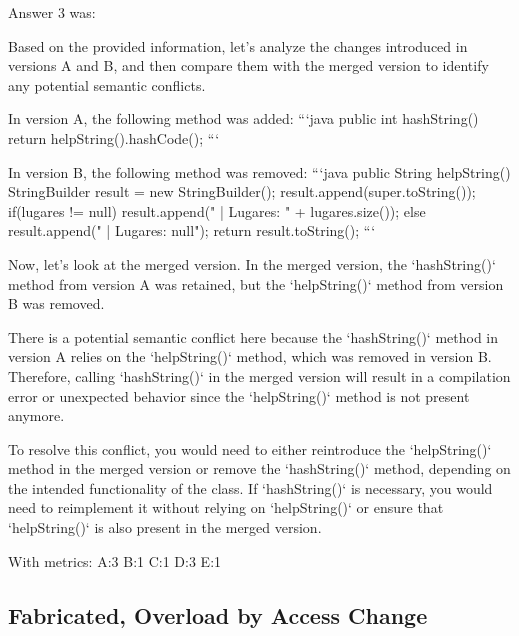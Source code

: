 Answer 3 was:
\begin{spverbatim}
Based on the provided information, let's analyze the changes introduced in versions A and B, and then compare them with the merged version to identify any potential semantic conflicts.

In version A, the following method was added:
```java
public int hashString(){
    return helpString().hashCode();
}
```

In version B, the following method was removed:
```java
public String helpString(){
    StringBuilder result = new StringBuilder();
    result.append(super.toString());
    if(lugares != null)
        result.append(" | Lugares: " + lugares.size());
    else
        result.append(" | Lugares: null");
    return result.toString();
}
```

Now, let's look at the merged version. In the merged version, the `hashString()` method from version A was retained, but the `helpString()` method from version B was removed.

There is a potential semantic conflict here because the `hashString()` method in version A relies on the `helpString()` method, which was removed in version B. Therefore, calling `hashString()` in the merged version will result in a compilation error or unexpected behavior since the `helpString()` method is not present anymore.

To resolve this conflict, you would need to either reintroduce the `helpString()` method in the merged version or remove the `hashString()` method, depending on the intended functionality of the class. If `hashString()` is necessary, you would need to reimplement it without relying on `helpString()` or ensure that `helpString()` is also present in the merged version.
\end{spverbatim}

With metrics:
A:3
B:1
C:1
D:3
E:1

\subsection{Fabricated, Overload by Access Change}

